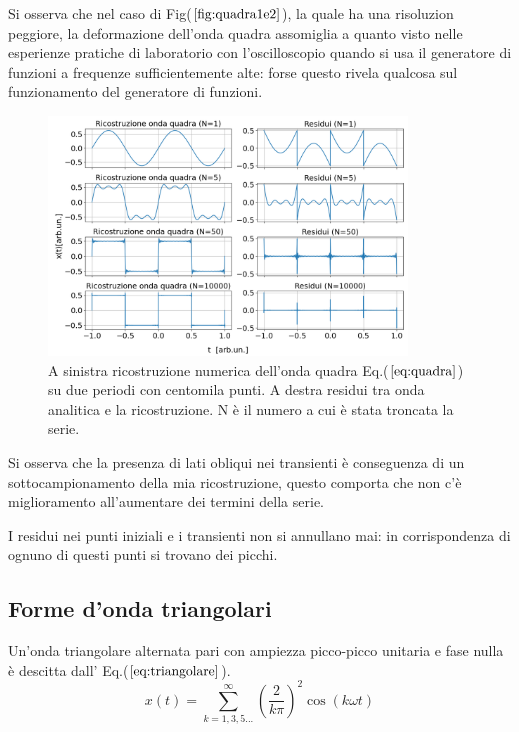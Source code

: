 \documentclass{article}
\begin{document}
        \noindent Si osserva che nel caso di Fig($\ref{fig:quadra1e2}$),
        la quale ha una risoluzion  peggiore, la deformazione dell'onda quadra assomiglia a quanto visto nelle esperienze 
        pratiche di laboratorio con l'oscilloscopio quando si usa il generatore di funzioni a
        frequenze sufficientemente alte: forse questo rivela qualcosa sul funzionamento del generatore
        di funzioni.\\

        \begin{figure}[htbp]
            \centering
            \includegraphics[width=0.85\textwidth]{fousquarewave1e5.png} %
            \caption{A sinistra ricostruzione numerica dell'onda quadra Eq.($\ref{eq:quadra}$) su
                    due periodi con centomila punti.
                    A destra residui tra onda analitica e la ricostruzione.
                    N è il numero a cui è stata troncata la serie.}            \label{fig:quadra1e5}
        \end{figure}  
        
        
        \noindent Si osserva che la presenza di lati obliqui nei transienti è conseguenza di un sottocampionamento
        della mia ricostruzione, questo comporta che non c'è miglioramento all'aumentare dei termini 
        della serie.

        \noindent I residui nei punti iniziali e i transienti non si annullano mai: in corrispondenza di ognuno di
        questi punti si trovano dei picchi. \newline \newline


    \subsection{Forme d'onda triangolari}
        Un'onda triangolare alternata pari con ampiezza picco-picco unitaria
        e fase nulla è descitta dall' Eq.($\ref{eq:triangolare}$).
        \begin{equation}
            x(t) = \sum_{k=1,3,5...}^{\infty} \left(\frac{2}{k\pi}\right)^{2}\cos\left(k\omega t\right)
            \label{eq:triangolare}
        \end{equation}
\end{document}
